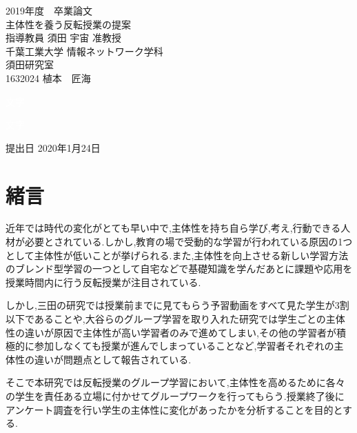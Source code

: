 \documentclass[a4j,11pt]{jsarticle}
\begin{document}
\setcounter{tocdepth}{3}
\thispagestyle{empty}
\clearpage
\addtocounter{page}{-1}
\begin{center}

\huge
2019年度　卒業論文\\[70pt]
\HUGE
主体性を養う反転授業の提案\\[70pt]
\huge
指導教員 須田 宇宙 准教授\\[50pt]
千葉工業大学 情報ネットワーク学科\\[20pt]
須田研究室\\[40pt]
1632024 \hspace{70pt} 植本　匠海\\[110pt]
\end{center}
\begin{flushright} 
\huge

\textcolor{white}{文字}

\textcolor{white}{文字}

提出日 2020年1月24日
\end{flushright}
\newpage
\pagestyle{empty}
\clearpage
\addtocounter{page}{-1}
\large
\tableofcontents
\thispagestyle{empty}
\clearpage
\pagestyle{plain}
\newpage

\listoftables
\listoffigures
\thispagestyle{empty}
\addtocounter{page}{-1}
\newpage

\addtocounter{page}{-1}
\section{緒言}

近年では時代の変化がとても早い中で,主体性を持ち自ら学び,考え,行動できる人材が必要とされている.しかし,教育の場で受動的な学習が行われている原因の1つとして主体性が低いことが挙げられる.また,主体性を向上させる新しい学習方法のブレンド型学習の一つとして自宅などで基礎知識を学んだあとに課題や応用を授業時間内に行う反転授業が注目されている.

しかし,三田\cite{1}の研究では授業前までに見てもらう予習動画をすべて見た学生が3割以下であることや,大谷ら\cite{2}のグループ学習を取り入れた研究では学生ごとの主体性の違いが原因で主体性が高い学習者のみで進めてしまい,その他の学習者が積極的に参加しなくても授業が進んでしまっていることなど,学習者それぞれの主体性の違いが問題点として報告されている.

そこで本研究では反転授業のグループ学習において,主体性を高めるために各々の学生を責任ある立場に付かせてグループワークを行ってもらう.授業終了後にアンケート調査を行い学生の主体性に変化があったかを分析することを目的とする.
\newpage
\end{document}
